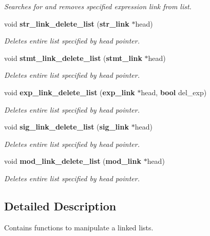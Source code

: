 \begin{CompactItemize}
\begin{CompactList}\small\item\em Searches for and removes specified expression link from list.\item\end{CompactList}\item 
void {\bf str\_\-link\_\-delete\_\-list} ({\bf str\_\-link} $\ast$head)
\begin{CompactList}\small\item\em Deletes entire list specified by head pointer.\item\end{CompactList}\item 
void {\bf stmt\_\-link\_\-delete\_\-list} ({\bf stmt\_\-link} $\ast$head)
\begin{CompactList}\small\item\em Deletes entire list specified by head pointer.\item\end{CompactList}\item 
void {\bf exp\_\-link\_\-delete\_\-list} ({\bf exp\_\-link} $\ast$head, {\bf bool} del\_\-exp)
\begin{CompactList}\small\item\em Deletes entire list specified by head pointer.\item\end{CompactList}\item 
void {\bf sig\_\-link\_\-delete\_\-list} ({\bf sig\_\-link} $\ast$head)
\begin{CompactList}\small\item\em Deletes entire list specified by head pointer.\item\end{CompactList}\item 
void {\bf mod\_\-link\_\-delete\_\-list} ({\bf mod\_\-link} $\ast$head)
\begin{CompactList}\small\item\em Deletes entire list specified by head pointer.\item\end{CompactList}\end{CompactItemize}


\subsection{Detailed Description}
Contains functions to manipulate a linked lists.



